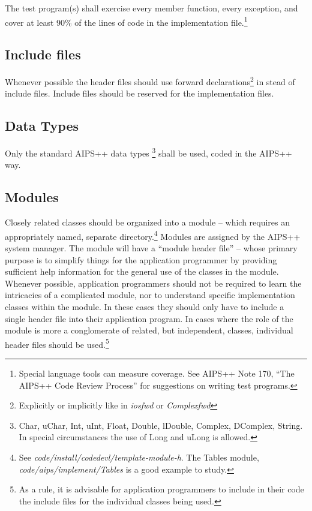 The test program(s) shall exercise every member function, every exception, and 
cover at least 90\% of the lines of code in the implementation file.\footnote
{Special language tools can measure coverage.  See AIPS++ Note 170,
``The AIPS++ Code Review Process'' for suggestions on writing test programs.}
\subsection {Include files} \bmar Whenever possible the header files should
use forward declarations\footnote {Explicitly or implicitly like in {\it
iosfwd} or {\it Complexfwd}} in stead of include files. Include files should
be reserved for the implementation files.
\subsection {Data Types} \bmar Only the standard AIPS++ data types 
\footnote {Char, uChar, Int, uInt, Float, Double, lDouble, Complex, DComplex,
String. In special circumstances the use of Long and uLong is allowed.} 
shall be used, coded in the AIPS++ way. 
\subsection {Modules} Closely related classes should be organized into a
module -- which requires an appropriately named, separate directory.\footnote
{See {\em code/install/codedevl/template-module-h}. The Tables module,
{\em code/aips/implement/Tables} is a good example to study.} Modules \bmar
are assigned by the AIPS++ system manager. The module
will have a ``module header file'' -- whose primary purpose is to simplify
things for the application programmer by \bmar providing sufficient help
information for the general use of the classes in the module.
\bmar  Whenever possible, application
programmers should not be required to learn the intricacies of a complicated
module, nor to understand specific implementation classes within the
module. In these cases they 
should only have to include a single header file into their application
program. In cases where the role of the module is more a conglomerate of
related, but independent, classes, individual header files \bmar should be
used.\footnote {As a rule, it is advisable for application programmers to
include in their code the include files for the individual classes being
used.}

